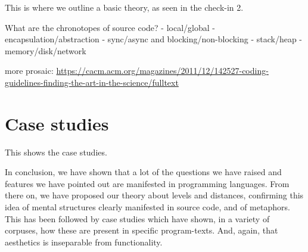 This is where we outline a basic theory, as seen in the check-in 2.

What are the chronotopes of source code?
- local/global
- encapsulation/abstraction
- sync/async and blocking/non-blocking
- stack/heap
- memory/disk/network

more prosaic: \url{https://cacm.acm.org/magazines/2011/12/142527-coding-guidelines-finding-the-art-in-the-science/fulltext}

\section{Case studies}
\label{sec:case-studies}

This shows the case studies.

\spacer


In conclusion, we have shown that a lot of the questions we have raised and features we have pointed out are manifested in programming languages. From there on, we have proposed our theory about levels and distances, confirming this idea of mental structures clearly manifested in source code, and of metaphors. This has been followed by case studies which have shown, in a variety of corpuses, how these are present in specific program-texts. And, again, that aesthetics is inseparable from functionality.